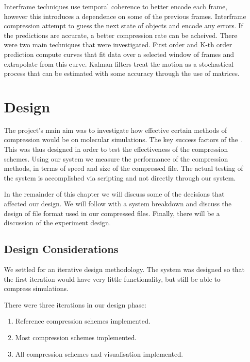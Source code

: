 \documentclass[a4paper,11pt]{report}
\begin{document}
Interframe techniques use temporal coherence to better encode each frame, however this introduces a dependence on some of the previous frames. Interframe compression attempt to guess the next state of objects and encode any errors. If the predictions are accurate, a better compression rate can be acheived. There were two main techniques that were investigated. First order and K-th order prediction compute curves that fit data over a selected window of frames and extrapolate from this curve. Kalman filters treat the motion as a stochastical process that can be estimated with some accuracy through the use of matrices.

\chapter{Design}

The project's main aim was to investigate how effective certain methods of compression would be on molecular simulations. The key success factors of the . This was thus designed in order to test the effectiveness of the compression schemes. Using our system we measure the performance of the compression methods, in terms of speed and size of the compressed file. The actual testing of the system is accomplished via scripting and not directly through our system.

In the remainder of this chapter we will discuss some of the decisions that affected our design. We will follow with a system breakdown and discuss the design of file format used in our compressed files. Finally, there will be a discussion of the experiment design. 

\section{Design Considerations}

We settled for an iterative design methodology. The system was designed so that the first iteration would have very little functionality, but still be able to compress simulations. 

There were three iterations in our design phase:
\begin{enumerate}
 \item Reference compression schemes implemented.
 \item Most compression schemes implemented.
 \item All compression schemes and visualisation implemented.
\end{enumerate}
\end{document}
